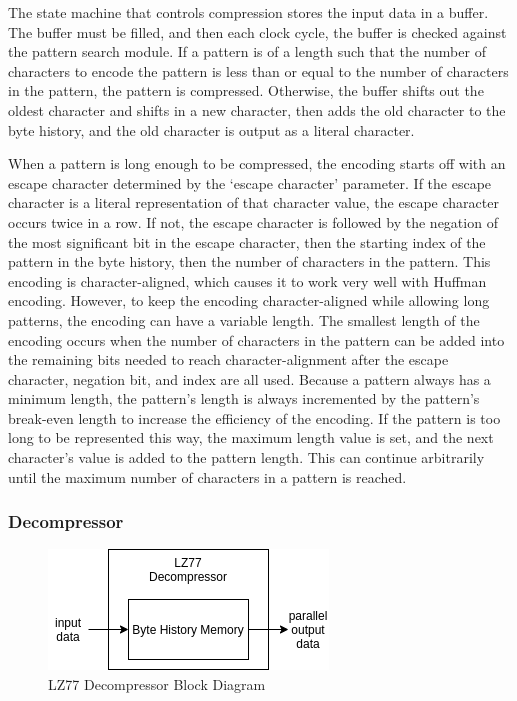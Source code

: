 \documentclass[doublespace,nopageskip]{VTthesis}
\begin{document}
The state machine that controls compression stores the input data in a buffer. The buffer must be filled, and then each clock cycle, the buffer is checked against the pattern search module. If a pattern is of a length such that the number of characters to encode the pattern is less than or equal to the number of characters in the pattern, the pattern is compressed. Otherwise, the buffer shifts out the oldest character and shifts in a new character, then adds the old character to the byte history, and the old character is output as a literal character.

When a pattern is long enough to be compressed, the encoding starts off with an escape character determined by the `escape character' parameter. If the escape character is a literal representation of that character value, the escape character occurs twice in a row. If not, the escape character is followed by the negation of the most significant bit in the escape character, then the starting index of the pattern in the byte history, then the number of characters in the pattern. This encoding is character-aligned, which causes it to work very well with Huffman encoding. However, to keep the encoding character-aligned while allowing long patterns, the encoding can have a variable length. The smallest length of the encoding occurs when the number of characters in the pattern can be added into the remaining bits needed to reach character-alignment after the escape character, negation bit, and index are all used. Because a pattern always has a minimum length, the pattern's length is always incremented by the pattern's break-even length to increase the efficiency of the encoding. If the pattern is too long to be represented this way, the maximum length value is set, and the next character's value is added to the pattern length. This can continue arbitrarily until the maximum number of characters in a pattern is reached. 

\subsubsection{Decompressor}\label{sss:lz77_decompressor_implementation}

\begin{figure}[htb]
	\centering
	\includegraphics[scale=1]{LZ77 Decompressor.png}
	\caption{LZ77 Decompressor Block Diagram}
	\label{fig:lz77_decompressor_block_diagram}
\end{figure}
\end{document}
